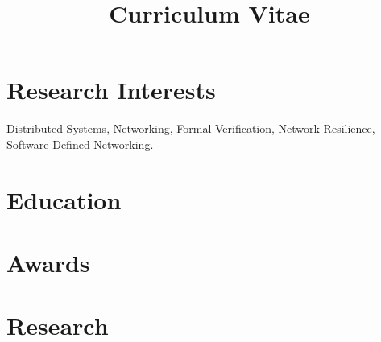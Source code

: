 \documentclass[11pt,letterpaper,sans]{moderncv}        %
\title{Curriculum Vitae}                               %
\newcommand\eat[1]{}
\begin{document}
\makecvtitle
\section{Research Interests}
Distributed Systems, Networking, Formal Verification, Network Resilience, Software-Defined Networking.

\section{Education}

\section{Awards}

\section{Research}
\eat{Network policy (for instance isolation policies implemented by firewalls or caching as done by web proxies) enforcement requires
a variety of middleboxes to act correctly in concert: for instance isolation policies require not just that firewalls be correctly configured but also require
that no previous middleboxes strip information required by the firewall. This project focuses on providing tools that given network topology and higher level
policies produce proofs that the policies are enforced or counterexamples where they are not.}

\eat{Network policies (from above) often depend on shared information (for instance the identity of the user associated with a particular
IP address). The CAP theorem indicates that in general distributed data stores must make a choice between consistency and availability in the presence of
failures (partitions). We investigate the implications of the CAP theorem on policy enforcement in SDN networks and also look at the weakest consistency model
required by a variety of network policies.}
\end{document}

